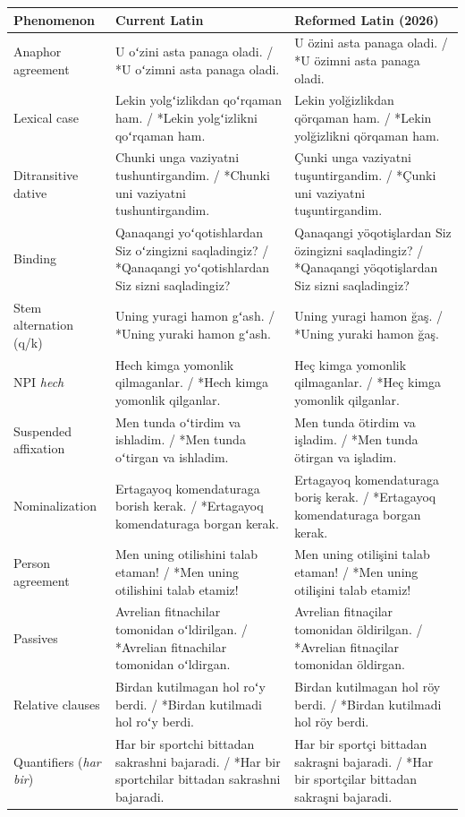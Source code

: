 \begin{table}[t]
\centering\small
\begin{tabular}{lp{6.6cm}p{6.6cm}}
\toprule
Phenomenon & Current Latin & Reformed Latin (2026) \\
\midrule
Anaphor agreement & U oʻzini asta panaga oladi. / *U oʻzimni asta panaga oladi. & U özini asta panaga oladi. / *U özimni asta panaga oladi. \\
Lexical case & Lekin yolgʻizlikdan qoʻrqaman ham. / *Lekin yolgʻizlikni qoʻrqaman ham. & Lekin yolğizlikdan qörqaman ham. / *Lekin yolğizlikni qörqaman ham. \\
Ditransitive dative & Chunki unga vaziyatni tushuntirgandim. / *Chunki uni vaziyatni tushuntirgandim. & Çunki unga vaziyatni tuşuntirgandim. / *Çunki uni vaziyatni tuşuntirgandim. \\
Binding & Qanaqangi yoʻqotishlardan Siz oʻzingizni saqladingiz? / *Qanaqangi yoʻqotishlardan Siz sizni saqladingiz? & Qanaqangi yöqotişlardan Siz özingizni saqladingiz? / *Qanaqangi yöqotişlardan Siz sizni saqladingiz? \\
Stem alternation (q/k) & Uning yuragi hamon gʻash. / *Uning yuraki hamon gʻash. & Uning yuragi hamon ğaş. / *Uning yuraki hamon ğaş. \\
NPI \textit{hech} & Hech kimga yomonlik qilmaganlar. / *Hech kimga yomonlik qilganlar. & Heç kimga yomonlik qilmaganlar. / *Heç kimga yomonlik qilganlar. \\
Suspended affixation & Men tunda oʻtirdim va ishladim. / *Men tunda oʻtirgan va ishladim. & Men tunda ötirdim va işladim. / *Men tunda ötirgan va işladim. \\
Nominalization & Ertagayoq komendaturaga borish kerak. / *Ertagayoq komendaturaga borgan kerak. & Ertagayoq komendaturaga boriş kerak. / *Ertagayoq komendaturaga borgan kerak. \\
Person agreement & Men uning otilishini talab etaman! / *Men uning otilishini talab etamiz! & Men uning otilişini talab etaman! / *Men uning otilişini talab etamiz! \\
Passives & Avrelian fitnachilar tomonidan oʻldirilgan. / *Avrelian fitnachilar tomonidan oʻldirgan. & Avrelian fitnaçilar tomonidan öldirilgan. / *Avrelian fitnaçilar tomonidan öldirgan. \\
Relative clauses & Birdan kutilmagan hol roʻy berdi. / *Birdan kutilmadi hol roʻy berdi. & Birdan kutilmagan hol röy berdi. / *Birdan kutilmadi hol röy berdi. \\
Quantifiers (\textit{har bir}) & Har bir sportchi bittadan sakrashni bajaradi. / *Har bir sportchilar bittadan sakrashni bajaradi. & Har bir sportçi bittadan sakraşni bajaradi. / *Har bir sportçilar bittadan sakraşni bajaradi. \\

\end{tabular}
\end{table}
